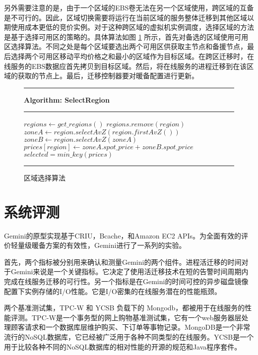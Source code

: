 另外需要注意的是，由于一个区域的EBS卷无法在另一个区域使用，跨区域的互备是不可行的。因此，区域切换需要将运行在当前区域的服务整体迁移到其他区域以期使用成本更低的竞价实例。对于这种跨区域的虚拟机实例调度，选择区域的方法是基于选择可用区的策略的。具体算法如图 \ref{figure:region-selection-algo} 所示，首先对备选的区域使用可用区选择算法。不同之处是每个区域要选出两个可用区供获取主节点和备援节点，最后选择两个可用区移动平均价格之和最小的区域作为目标区域。在跨区迁移时，在线服务的EBS数据应首先拷贝到目标区域。然后，将在线服务的进程迁移到在该区域的获取的节点上。最后，迁移控制器要对暖备配置进行更新。

\begin{figure}
\rule[-.2pt]{\textwidth}{0.9pt}
\textbf{Algorithm: SelectRegion}

\rule[-.2pt]{\textwidth}{0.5pt}

\begin{algorithmic}[1]

\State $regions\gets get\_regions()$
        \State $regions.remove(region)$
    \EndIf
\EndFor
{}
    \State $zoneA\gets region.selectAvZ(region.firstAvZ())$
    \State $zoneB\gets region.selectAvZ(zoneA)$
    \State $prices[region]\gets zoneA.spot\_price + zoneB.spot\_price$
\EndFor
\State $selected = min\_key(prices)$
\State {}

\end{algorithmic}
\rule[-.2pt]{\textwidth}{0.8pt}
\caption{区域选择算法}\label{figure:region-selection-algo}
\end{figure}

\section{系统评测}
Gemini的原型实现基于CRIU，Bcache，和Amazon EC2 APIs。为全面有效的评价轻量级暖备方案的有效性，Gemini进行了一系列的实验。

首先，两个指标被分别用来确认和测量Gemini的两个组件。进程活迁移的时间对于Gemini来说是一个关键指标。它决定了使用活迁移技术在短的告警时间周期内完成在线服务迁移的可行性。另一个指标是在Gemini的时间可控的异步磁盘镜像配置下实例存储的I/O性能。它是I/O密集的在线服务潜在的性能瓶颈。

两个基准测试集，TPC-W\cite{TPCW:2014} 和 YCSB\cite{YCSB:2014} 负载下的 Mongodb\cite{Mongodb:2014}，都被用于在线服务的性能评测。TPC-W是一个事务型的网上购物基准测试集，它有一个web服务器层处理顾客请求和一个数据库层维护购买、下订单等事物记录。MongoDB是一个非常流行的NoSQL数据库，它已经被广泛用于各种不同类型的在线服务。YCSB是一个用于比较各种不同的NoSQL数据库的相对性能的开源的规范和Java程序套件。

